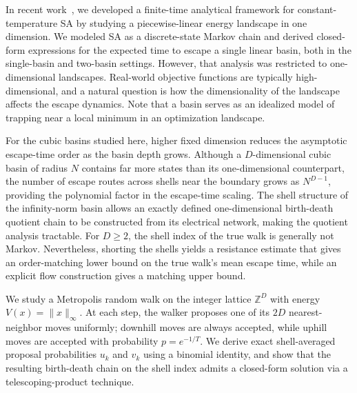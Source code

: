 \documentclass[conference]{IEEEtran}
\newcommand{\Z}{\mathbb{Z}}
\newcommand{\norm}[1]{\lVert #1\rVert}
\begin{document}
In recent work~\cite{ramachandran2026}, we developed a finite-time
analytical framework for constant-temperature SA by studying a
piecewise-linear energy landscape in one dimension.
We modeled SA as a discrete-state Markov chain and derived closed-form
expressions for the expected time to escape a single linear basin,
both in the single-basin and two-basin settings. 
However, that analysis was restricted to one-dimensional landscapes.
Real-world objective functions are typically high-dimensional, and a
natural question is how the dimensionality of the landscape affects
the escape dynamics. Note that a basin serves as an idealized model of trapping near a local minimum in an optimization landscape.

For the cubic basins studied here, higher fixed dimension reduces
the asymptotic escape-time order as the basin depth grows.
Although a $D$-dimensional cubic basin of radius $N$ contains far more
states than its one-dimensional counterpart, the number of escape routes across shells near the boundary grows as $N^{D-1}$, providing the
polynomial factor in the escape-time scaling.
The shell structure of the infinity-norm basin
allows an exactly defined one-dimensional birth-death quotient chain
to be constructed from its electrical network, making the quotient analysis tractable.
For $D\ge2$, the shell index of the true walk is generally
not Markov. Nevertheless, shorting the shells yields a
resistance estimate that gives an order-matching lower bound
on the true walk's mean escape time, while an explicit flow
construction gives a matching upper bound.


We study a Metropolis random walk on the integer lattice $\Z^D$ with
energy $V(x)=\norm{x}_\infty$.
At each step, the walker proposes one of its $2D$ nearest-neighbor moves
uniformly; downhill moves are always accepted, while uphill moves are
accepted with probability $p=e^{-1/T}$.
We derive exact shell-averaged proposal probabilities $u_k$ and $v_k$
using a binomial identity, and show that the resulting birth-death chain
on the shell index admits a closed-form solution via a telescoping-product
technique.
\end{document}

